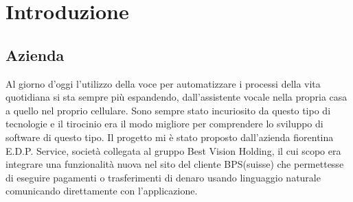 \chapter{Introduzione}
\section{Azienda}
Al giorno d'oggi l'utilizzo della voce per automatizzare i processi della vita quotidiana si sta sempre più espandendo, dall'assistente vocale nella propria casa a quello nel proprio cellulare. Sono sempre stato incuriosito da questo tipo di tecnologie e il tirocinio era il modo migliore per comprendere lo sviluppo di software di questo tipo. Il progetto mi è stato proposto dall'azienda fiorentina E.D.P. Service, società collegata al gruppo Best Vision Holding, il cui scopo era integrare una funzionalità nuova nel sito del cliente BPS(suisse) che permettesse di eseguire pagamenti o trasferimenti di denaro usando linguaggio naturale comunicando direttamente con l'applicazione.
